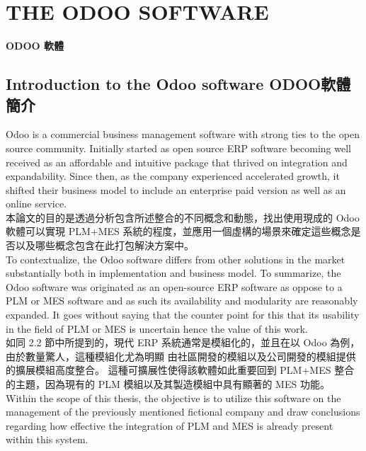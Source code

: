 \chapter{THE ODOO SOFTWARE} 
\setcounter{page}{26}  %
\begin{center}
\fontsize{18}{16}\selectfont \textbf{ODOO 軟體}\\
\end{center}


\section{Introduction to the Odoo software ODOO軟體簡介}
\fontsize{12}{2.5pt}\sectionef  
{Odoo is a commercial business management software with strong ties to the open source community. Initially started as open source ERP software becoming well received as an affordable and intuitive package that thrived on integration and expandability. Since then, as the company experienced accelerated growth, it shifted their business model to include an enterprise paid version as well as an online service.}\\[1pt]

\fontsize{12}{2.5pt}\sectionef 
{本論文的目的是透過分析包含所述整合的不同概念和動態，找出使用現成的 Odoo 軟體可以實現 PLM+MES 系統的程度，並應用一個虛構的場景來確定這些概念是否以及哪些概念包含在此打包解決方案中。}\\[15pt]

\fontsize{12}{2.5pt}\sectionef
{To contextualize, the Odoo software differs from other solutions in the market substantially both in implementation and business model. To summarize, the Odoo software 
was originated as an open-source ERP software as oppose to a PLM or MES software and as such its availability and modularity are reasonably expanded. It goes without saying that the counter point for this that its usability in the field of PLM or MES is uncertain hence the value of this work.}\\[1pt]

\fontsize{12}{2.5pt}\sectionef  
{如同 2.2 節中所提到的，現代 ERP 系統通常是模組化的，並且在以 Odoo 為例，由於數量驚人，這種模組化尤為明顯
由社區開發的模組以及公司開發的模組提供的擴展模組高度整合。 這種可擴展性使得該軟體如此重要回到 PLM+MES 整合的主題，因為現有的 PLM 模組以及其製造模組中具有顯著的 MES 功能。}\\[15pt]

\fontsize{12}{2.5pt}\sectionef  
{Within the scope of this thesis, the objective is to utilize this software on the management of the previously mentioned fictional company and draw conclusions regarding how effective the integration of PLM and MES is already present within this system.  }\\[1pt]

